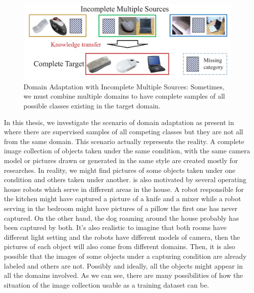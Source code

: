 \begin{figure}[tbh]
  \centering
    \includegraphics[width=\textwidth]{abbildungen/IMS-DA.png}
  \caption{Domain Adaptation with Incomplete Multiple Sources: Sometimes, we must combine multiple domains to have complete samples of all possible classes existing in the target domain. \cite{multisourceDA}} 
  \label{fig:imsDA}
\end{figure}

In this thesis, we investigate the scenario of domain adaptation as present in \cite{domainMixture} where there are supervised samples of all competing classes but they are not all from the same domain. This scenario actually represents the reality. A complete image collection of objects taken under the same condition, with the same camera model or pictures drawn or generated in the same style are created mostly for researches. In reality, we might find pictures of some objects taken under one condition and others taken under another. \cite{domainMixture} is also motivated by several operating house robots which serve in different areas in the house. A robot responsible for the kitchen might have captured a picture of a knife and a mixer while a robot serving in the bedroom might have pictures of a pillow the first one has never captured. On the other hand, the dog roaming around the house probably has been captured by both. It’s also realistic to imagine that both rooms have different light setting and the robots have different models of camera, then the pictures of each object will also come from different domains. Then, it is also possible that the images of some objects under a capturing condition are already labeled and others are not. Possibly and ideally, all the objects might appear in all the domains involved. As we can see, there are many possibilities of how the situation of the image collection usable as a training dataset can be.   

